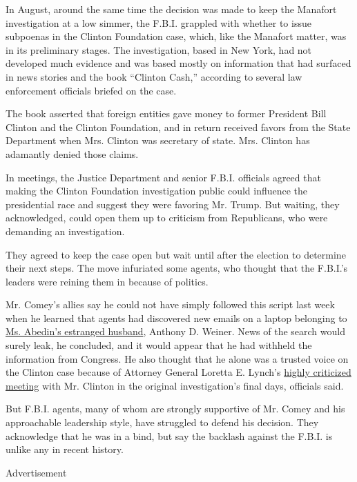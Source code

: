 In August, around the same time the decision was made to keep the
Manafort investigation at a low simmer, the F.B.I. grappled with whether
to issue subpoenas in the Clinton Foundation case, which, like the
Manafort matter, was in its preliminary stages. The investigation, based
in New York, had not developed much evidence and was based mostly on
information that had surfaced in news stories and the book ``Clinton
Cash,'' according to several law enforcement officials briefed on the
case.

The book asserted that foreign entities gave money to former President
Bill Clinton and the Clinton Foundation, and in return received favors
from the State Department when Mrs. Clinton was secretary of state. Mrs.
Clinton has adamantly denied those claims.

In meetings, the Justice Department and senior F.B.I. officials agreed
that making the Clinton Foundation investigation public could influence
the presidential race and suggest they were favoring Mr. Trump. But
waiting, they acknowledged, could open them up to criticism from
Republicans, who were demanding an investigation.

They agreed to keep the case open but wait until after the election to
determine their next steps. The move infuriated some agents, who thought
that the F.B.I.'s leaders were reining them in because of politics.

Mr. Comey's allies say he could not have simply followed this script
last week when he learned that agents had discovered new emails on a
laptop belonging to
\href{http://www.nytimes.com/2016/10/31/us/politics/anthony-weiner-democratic-reaction.html}{Ms.
Abedin's estranged husband}, Anthony D. Weiner. News of the search would
surely leak, he concluded, and it would appear that he had withheld the
information from Congress. He also thought that he alone was a trusted
voice on the Clinton case because of Attorney General Loretta E. Lynch's
\href{http://www.nytimes.com/2016/07/01/us/politics/meeting-between-bill-clinton-and-loretta-lynch-provokes-political-furor.html}{highly
criticized meeting} with Mr. Clinton in the original investigation's
final days, officials said.

But F.B.I. agents, many of whom are strongly supportive of Mr. Comey and
his approachable leadership style, have struggled to defend his
decision. They acknowledge that he was in a bind, but say the backlash
against the F.B.I. is unlike any in recent history.

Advertisement

